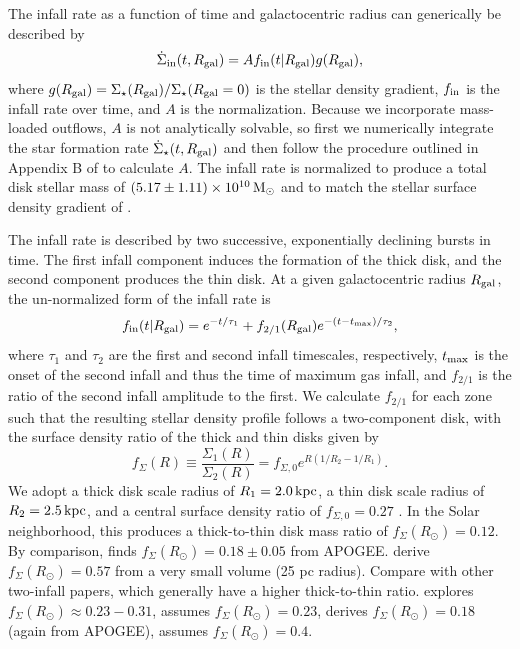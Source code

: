 \documentclass[twocolumn,twocolappendix,linenumbers]{aastex631}
\newcommand{\todo}[1]{{\color{red}#1}}
\begin{document}
The infall rate as a function of time and galactocentric radius can generically be described by
\begin{equation}
    \label{eq:infall-rate}
    \dot\Sigma_{\rm in}(t,R_{\rm gal}) = A f_{\rm in}(t|R_{\rm gal}) g(R_{\rm gal}),
\end{equation}
where $g(R_{\rm gal})=\Sigma_\star(R_{\rm gal}) / \Sigma_\star(R_{\rm gal}=0)$ is the stellar density gradient, $f_{\rm in}$ is the infall rate over time, and $A$ is the normalization. Because we incorporate mass-loaded outflows, $A$ is not analytically solvable, so first we numerically integrate the star formation rate $\dot\Sigma_\star(t,R_{\rm gal})$ and then follow the procedure outlined in Appendix B of \citet{johnson_stellar_2021} to calculate $A$. The infall rate is normalized to produce a total disk stellar mass of $(5.17\pm1.11)\times 10^{10}\,{\rm M}_\odot$ \citep{licquia_improved_2015} and to match the stellar surface density gradient of \citet{bland-hawthorn_galaxy_2016}.

The infall rate is described by two successive, exponentially declining bursts in time. The first infall component induces the formation of the thick disk, and the second component produces the thin disk. At a given galactocentric radius $R_{\rm gal}$, the un-normalized form of the infall rate is
\begin{equation}
    \label{eq:twoinfall-ifr}
    f_{\rm in}(t|R_{\rm gal}) = e^{-t/\tau_1} + f_{2/1}(R_{\rm gal}) e^{-(t-t_{\rm max})/\tau_2},
\end{equation}
where $\tau_1$ and $\tau_2$ are the first and second infall timescales, respectively, $t_{\rm max}$ is the onset of the second infall and thus the time of maximum gas infall, and $f_{2/1}$ is the ratio of the second infall amplitude to the first. We calculate $f_{2/1}$ for each zone such that the resulting stellar density profile follows a two-component disk, with the surface density ratio of the thick and thin disks given by
\begin{equation}
    f_\Sigma(R) \equiv \frac{\Sigma_1(R)}{\Sigma_2(R)} = f_{\Sigma,0} e^{R(1/R_2 - 1/R_1)}.
\end{equation}
We adopt a thick disk scale radius of $R_1=2.0\,{\rm kpc}$, a thin disk scale radius of $R_2=2.5\,{\rm kpc}$, and a central surface density ratio of $f_{\Sigma,0}=0.27$ \citep{bland-hawthorn_galaxy_2016}. In the Solar neighborhood, this produces a thick-to-thin disk mass ratio of $f_\Sigma(R_\odot)=0.12$. By comparison, \citet{mackereth_age-metallicity_2017} finds $f_\Sigma(R_\odot)=0.18\pm0.05$ from APOGEE. \citet{fuhrmann_local_2017} derive $f_\Sigma(R_\odot)=0.57$ from a very small volume (25 pc radius). \todo{Compare with other two-infall papers, which generally have a higher thick-to-thin ratio.} \citet{spitoni_galactic_2020} explores $f_\Sigma(R_\odot)\approx0.23-0.31$, \citet{palla_chemical_2020} assumes $f_\Sigma(R_\odot)=0.23$, \citet{spitoni_apogee_2021} derives $f_\Sigma(R_\odot)=0.18$ (again from APOGEE), \citet{spitoni_remind_2024} assumes $f_\Sigma(R_\odot)=0.4$.
\end{document}
